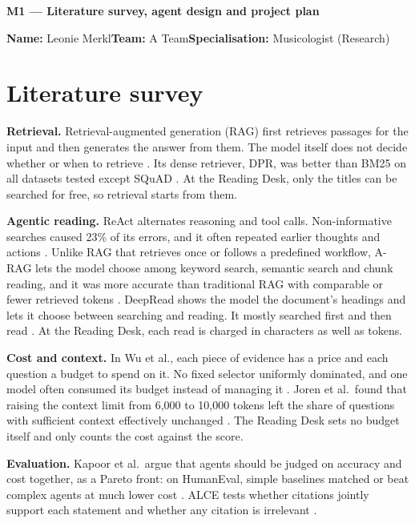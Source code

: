 \documentclass[11pt,a4paper]{article}
\newcommand\myname{Leonie Merkl}
\newcommand\myteam{A Team}
\newcommand\lead[1]{\vspace{-\parskip}\textbf{#1}}
\begin{document}
{\Large\bfseries M1 --- Literature survey, agent design and project plan}\par\medskip
\textbf{Name:} \myname \quad \textbf{Team:} \myteam \quad \textbf{Specialisation:} Musicologist
(Research)\par\medskip

\section{Literature survey}\label{sec:survey}

\lead{Retrieval.} Retrieval-augmented generation (RAG) first retrieves passages for the input and then
generates the answer from them. The model itself does not decide whether or when to retrieve
\parencite{lewis2020retrieval}. Its dense retriever, DPR, was better than BM25 on all datasets tested except SQuAD
\parencite{karpukhin2020dense}. At the Reading Desk, only the titles can be searched for free, so retrieval starts from them.

\lead{Agentic reading.} ReAct alternates reasoning and tool calls. Non-informative searches caused 23\% of its
errors, and it often repeated earlier thoughts and actions \parencite{yao2023react}. Unlike RAG that retrieves
once or follows a predefined workflow, A-RAG lets the model choose among keyword search, semantic search and
chunk reading, and it was more accurate than traditional RAG with comparable or fewer retrieved tokens
\parencite{du2026arag}. DeepRead shows the model the document's headings and lets it choose between searching
and reading. It mostly searched first and then read \parencite{li2026deepread}. At the Reading Desk, each read is charged in characters as well as tokens.

\lead{Cost and context.} In Wu et al., each piece of evidence has a price and each question a budget to spend on it. No fixed selector
uniformly dominated, and one model often consumed its budget instead of managing it
\parencite{wu2026knowledge}. Joren et al.\ found that raising the context limit from 6,000 to 10,000 tokens
left the share of questions with sufficient context effectively unchanged \parencite{joren2025sufficient}. The Reading Desk sets no budget itself and only counts the cost against the score.

\lead{Evaluation.} Kapoor et al.\ argue that agents should be judged on accuracy and cost together, as a Pareto
front: on HumanEval, simple baselines matched or beat complex agents at much lower cost
\parencite{kapoor2024ai}. ALCE tests whether citations jointly support each statement and whether any citation
is irrelevant \parencite{gao2023enabling}.
\end{document}
